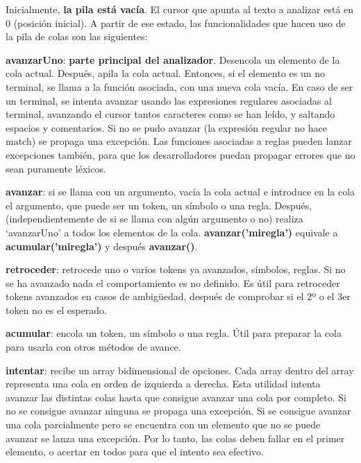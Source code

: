 \documentclass{report}
\begin{document}
	\vspace{10px}
	
	Inicialmente, \textbf{la pila está vacía}. El cursor que apunta al texto a analizar está en 0 (posición inicial). A partir de ese estado, las funcionalidades que hacen uso de la pila de colas son las siguientes:
	
	\vspace{10px}
	\noindent
	\textbf{avanzarUno}: \textbf{parte principal del analizador}. Desencola un elemento de la cola actual. Después, apila la cola actual. Entonces, si el elemento es un no terminal, se llama a la función asociada, con una nueva cola vacía. En caso de ser un terminal, se intenta avanzar usando las expresiones regulares asociadas al terminal, avanzando el cursor tantos caracteres como se han leído, y saltando espacios y comentarios. Si no se pudo avanzar (la expresión regular no hace match) se propaga una excepción. Las funciones asociadas a reglas pueden lanzar excepciones también, para que los desarrolladores puedan propagar errores que no sean puramente léxicos.
	
	\vspace{10px}
	\noindent
	\textbf{avanzar}: si se llama con un argumento, vacía la cola actual e introduce en la cola el argumento, que puede ser un token, un símbolo o una regla. Después, (independientemente de si se llama con algún argumento o no) realiza `avanzarUno' a todos los elementos de la cola.  \textbf{avanzar('miregla')} equivale a \textbf{acumular('miregla')} y después \textbf{avanzar()}.
	
	\vspace{10px}
	\noindent
	\textbf{retroceder}: retrocede uno o varios tokens ya avanzados, símbolos, reglas. Si no se ha avanzado nada el comportamiento es no definido. Es útil para retroceder tokens avanzados en casos de ambigüedad, después de comprobar si el 2º o el 3er token no es el esperado. 
	
	\vspace{10px}
	\noindent
	\textbf{acumular}: encola un token, un símbolo o una regla. Útil para preparar la cola para usarla con otros métodos de avance.
	
	\vspace{10px}
	\noindent
	\textbf{intentar}: recibe un array bidimensional de opciones. Cada array dentro del array representa una cola en orden de izquierda a derecha. Esta utilidad intenta avanzar las distintas colas hasta que consigue avanzar una cola por completo. Si no se consigue avanzar ninguna se propaga una excepción. Si se consigue avanzar una cola parcialmente pero se encuentra con un elemento que no se puede avanzar se lanza una excepción. Por lo tanto, las colas deben fallar en el primer elemento, o acertar en todos para que el intento sea efectivo.
	
\end{document}
